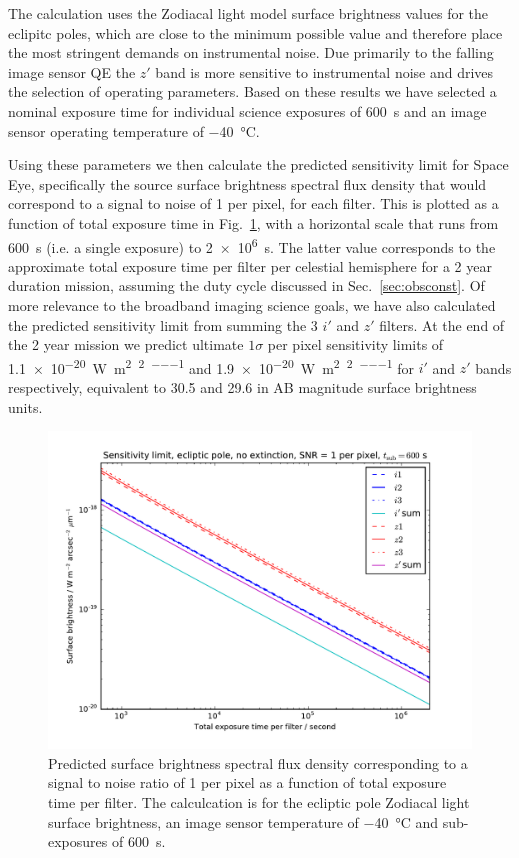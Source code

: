 \documentclass[]{iac}
\begin{document}
The calculation uses the Zodiacal light model surface brightness values for the eclipitc poles, which are close to the
minimum possible value and therefore place the most stringent demands on instrumental noise. Due primarily to the
falling image sensor QE the $z'$ band is more sensitive to instrumental noise and drives the selection of operating
parameters. Based on these results we have selected a nominal exposure time for individual science exposures of
\SI{600}{\second} and an image sensor operating temperature of \SI{-40}{\celsius}.

Using these parameters we then calculate the predicted sensitivity limit for Space Eye, specifically the source surface
brightness spectral flux density that would correspond to a signal to noise of 1 per pixel, for each filter. This is
plotted as a function of total exposure time in Fig.~\ref{fig:sens}, with a horizontal scale that runs from
\SI{600}{\second} (i.e. a single exposure) to \SI{2e6}{\second}. The latter value corresponds to the approximate total
exposure time per filter per celestial hemisphere for a 2 year duration mission, assuming the duty cycle discussed in
Sec.~\ref{sec:obsconst}. Of more relevance to the broadband imaging science goals, we have also calculated the predicted
sensitivity limit from summing the 3 $i'$ and $z'$ filters. At the end of the 2 year mission we predict ultimate
$1\sigma$ per pixel sensitivity limits of \SI{1.1e-20}{\watt\per\metre\squared\per\tarcsecond\squared\per\micron} and
\SI{1.9e-20}{\watt\per\metre\squared\per\tarcsecond\squared\per\micron} for $i'$ and $z'$ bands respectively, equivalent
to 30.5 and 29.6 in AB magnitude surface brightness units.

\begin{figure}[tbp]
  \center \includegraphics[width=\columnwidth]{figures/sens.pdf}
  \caption{\label{fig:sens}Predicted surface brightness spectral flux density corresponding to a signal to noise ratio
    of 1 per pixel as a function of total exposure time per filter. The calculcation is for the ecliptic pole Zodiacal
    light surface brightness, an image sensor temperature of \SI{-40}{\celsius} and sub-exposures of \SI{600}{\second}.}
\end{figure}
\end{document}
